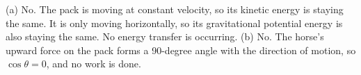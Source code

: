 (a) No. The pack is moving at constant velocity, so its kinetic energy is staying the same. It is only moving
horizontally, so its gravitational potential energy is also staying the same. No energy transfer is occurring. (b) No. The
horse's upward force on the pack forms a 90-degree angle with the direction of motion, so 
$\cos \theta=0$, and no work is done.



